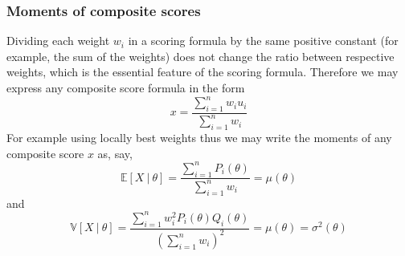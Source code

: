 \subsubsection{Moments of composite scores}
Dividing each weight $w_i$ in a scoring formula by the same positive constant (for example, the sum of the weights) does not change the ratio between respective weights, which is the essential feature of
the scoring formula. Therefore we may express any composite score formula in the form
\begin{equation}
x=\frac{\sum_{i=1}^n{w_iu_i}}{\sum_{i=1}^n{w_i}}
\end{equation}
For example using locally best weights thus we may write the moments of any composite score $x$ as, say,
\begin{equation}
\mathbb{E}[X \ | \ \theta]=\frac{\sum_{i=1}^n{P_i(\theta)}}{\sum_{i=1}^n{w_i}}=\mu(\theta)
\end{equation}
and
\begin{equation}
\mathbb{V}[X \ | \ \theta]=\frac{\sum_{i=1}^n{w_i^2P_i(\theta)Q_i(\theta)}}{\left( \sum_{i=1}^n{w_i}\right)^2}=\mu(\theta)=\sigma^2(\theta)
\end{equation}

